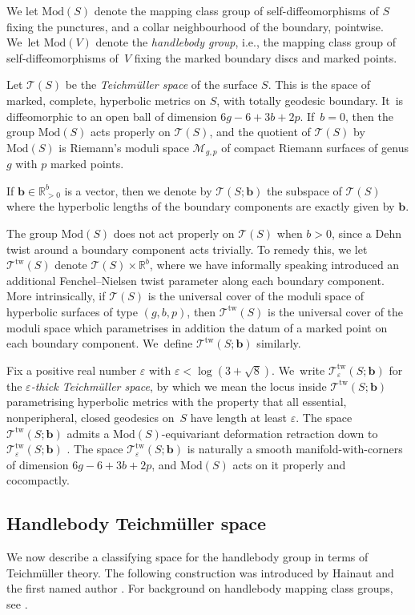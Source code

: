 \documentclass[11pt]{article}
\newcommand{\ie}{i.e.,\xspace}
\newcommand{\bb}{\boldsymbol{b}}
\theoremstyle{plain}
\theoremstyle{definition}
\let\eps\varepsilon
\newcommand{\R}{\mathbb R}
\newcommand{\T}{\mathcal T}
\newcommand{\TT}{\mathcal T^{\mathrm{tw}}}
\newcommand{\mcg}{\mathrm{Mod}}
\newcommand{\hmod}{\mathrm{Mod}}
\begin{document}
We let $\mcg(S)$ denote the mapping class group of self-diffeomorphisms of $S$ fixing the punctures, and a collar neighbourhood of the boundary, pointwise. We~let $\hmod(V)$ denote the \emph{handlebody group}, \ie the mapping class group of self-diffeomorphisms of~$V$ fixing the marked boundary discs and marked points.

Let $\T(S)$ be the \emph{Teichmüller space} of the surface $S$. This is the space of marked, complete, hyperbolic metrics on $S$, with totally geodesic boundary. It~is diffeomorphic to an open ball of dimension $6g-6+3b+2p$. If~$b=0$, then the group $\mcg(S)$ acts properly on $\T(S)$, and the quotient of $\T(S)$ by $\mcg(S)$ is Riemann's moduli space $\mathcal M_{g,p}$ of compact Riemann surfaces of genus $g$ with $p$ marked points.

If $\bb \in \mathbb R^b_{>0}$ is a vector, then we denote by $\T(S;\bb)$ the subspace of $\T(S)$ where the hyperbolic lengths of the boundary components are exactly given by $\bb$.

The group $\mcg(S)$ does not act properly on $\T(S)$ when $b>0$, since a Dehn twist around a boundary component acts trivially. To remedy this, we let $\TT(S)$ denote $\T(S) \times \R^b$, where we have informally speaking introduced an additional Fenchel--Nielsen twist parameter along each boundary component. More intrinsically, if $\T(S)$ is the universal cover of the moduli space of hyperbolic surfaces of type $(g,b,p)$, then $\TT(S)$ is the universal cover of the moduli space which parametrises in addition the datum of a marked point on each boundary component. We~define $\TT(S;\bb)$ similarly.

Fix a positive real number $\eps$ with $\eps<\log(3+\sqrt 8)$. We~write $\TT_\eps(S;\bb)$ for the \emph{$\eps$-thick Teichmüller space}, by which we mean the locus inside $\TT(S;\bb)$ parametrising hyperbolic metrics with the property that all essential, nonperipheral, closed geodesics on~$S$ have length at least $\eps$. The space $\TT(S;\bb)$ admits a $\mcg(S)$-equivariant deformation retraction down to $\TT_\eps(S;\bb)$ \cite{jiwolpert}. The space $\TT_\eps(S;\bb)$ is naturally a smooth manifold-with-corners of dimension $6g-6+3b+2p$, and $\mcg(S)$ acts on it properly and cocompactly.

\subsection{Handlebody Teichmüller space}
We now describe a classifying space for the handlebody group in terms of Teichmüller theory. The following construction was introduced by Hainaut and the first named author \cite{hainautpetersen}. For background on handlebody mapping class groups, see \cite{hensel}.
\end{document}
